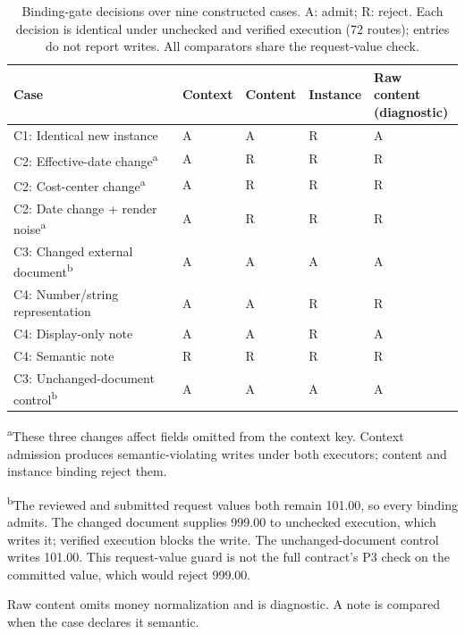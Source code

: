 \documentclass[pdflatex,sn-basic]{sn-jnl}
\begin{document}
\begin{table}[tbp]
\caption{Binding-gate decisions over nine constructed cases. A: admit; R: reject. Each decision is identical under unchecked and verified execution (72 routes); entries do not report writes. All comparators share the request-value check.}\label{tab:binding-scope}
\centering\small
\setlength{\tabcolsep}{0.8pt}
\renewcommand{\arraystretch}{1.12}
\begin{tabularx}{\textwidth}{@{}>{\raggedright\arraybackslash}p{}*{4}{>{\centering\arraybackslash}X}@{}}
\toprule
Case & Context & Content & Instance & \shortstack{Raw content\\(diagnostic)} \\
\midrule
C1: Identical new instance & A & A & R & A \\
C2: Effective-date change\textsuperscript{a} & A & R & R & R \\
C2: Cost-center change\textsuperscript{a} & A & R & R & R \\
C2: Date change + render noise\textsuperscript{a} & A & R & R & R \\
C3: Changed external document\textsuperscript{b} & A & A & A & A \\
C4: Number/string representation & A & A & R & R \\
C4: Display-only note & A & A & R & A \\
C4: Semantic note & R & R & R & R \\
C3: Unchanged-document control\textsuperscript{b} & A & A & A & A \\

\bottomrule
\end{tabularx}
\par\smallskip
\begin{minipage}{\textwidth}\small\raggedright
\textsuperscript{a}These three changes affect fields omitted from the context key. Context admission produces semantic-violating writes under both executors; content and instance binding reject them.\par
\textsuperscript{b}The reviewed and submitted request values both remain 101.00, so every binding admits. The changed document supplies 999.00 to unchecked execution, which writes it; verified execution blocks the write. The unchanged-document control writes 101.00. This request-value guard is not the full contract's P3 check on the committed value, which would reject 999.00.\par
Raw content omits money normalization and is diagnostic. A note is compared when the case declares it semantic.
\end{minipage}
\end{table}
\end{document}
